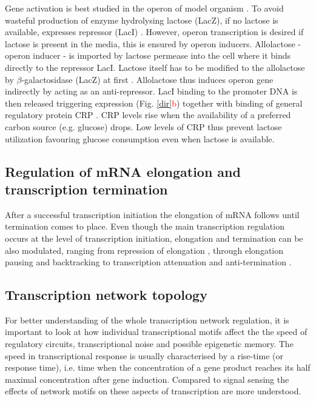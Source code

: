 Gene activation is best studied in the  operon of model organism .
To avoid wasteful production of enzyme hydrolysing lactose (LacZ), if no lactose is available,  expresses  repressor (LacI) \cite{hudson1990co}.
However,  operon transcription is desired if lactose is present in the media, this is ensured by  operon inducers.
Allolactose -  operon inducer - is imported by lactose permease into the cell where it binds directly to the repressor LacI.
Lactose itself has to be modified to the allolactose by $\beta$-galactosidase (LacZ) at first \cite{jobe1972lac, wheatley2013structural}.
Allolactose thus induces  operon gene indirectly by acting as an anti-repressor.
LacI binding to the promoter DNA is then released triggering  expression (Fig. \ref{dir}\textcolor{red}{b}) together with binding of general regulatory protein CRP \cite{hudson1990co, clark2005molecular}.
CRP levels rise when the availability of a preferred carbon source (e.g. glucose) drops.
Low levels of CRP thus prevent lactose utilization favouring glucose consumption even when lactose is available.

\subsection{Regulation of mRNA elongation and transcription termination}
After a successful transcription initiation the elongation of mRNA follows until termination comes to place.
Even though the main transcription regulation occurs at the level of transcription initiation, elongation and termination can be also modulated, ranging from repression of elongation \cite{monsalve1996protein}, through elongation pausing and backtracking \cite{mustaev2017transcription} to transcription attenuation and anti-termination \cite{naville2009transcription}.

\subsection{Transcription network topology}
For better understanding of the whole transcription network regulation, it is important to look at how individual transcriptional motifs affect the the speed of regulatory circuits, transcriptional noise and possible epigenetic memory.
The speed in transcriptional response is usually characterised by a rise-time (or response time), i.e. time when the concentration of a gene product reaches its half maximal concentration after gene induction.
Compared to signal sensing the effects of network motifs on these aspects of transcription are more understood.

